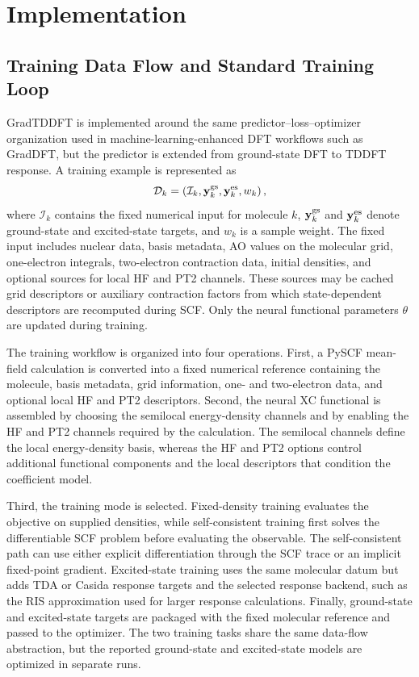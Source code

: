 \section{Implementation}
\label{sec:implementation}

\subsection{Training Data Flow and Standard Training Loop}
\label{sec:implementation-training-flow}

GradTDDFT is implemented around the same predictor--loss--optimizer
organization used in machine-learning-enhanced DFT workflows such as
GradDFT,\cite{GradDFT} but the predictor is extended from ground-state
DFT to TDDFT response.  A training example is represented as
\begin{equation}
  \mathcal{D}_k
  =
  \left(
    \mathcal{I}_k,
    \mathbf{y}^{\rm gs}_k,
    \mathbf{y}^{\rm es}_k,
    w_k
  \right),
  \label{eq:implementation-datum}
\end{equation}
where $\mathcal{I}_k$ contains the fixed numerical input for molecule
$k$, $\mathbf{y}^{\rm gs}_k$ and $\mathbf{y}^{\rm es}_k$ denote
ground-state and excited-state targets, and $w_k$ is a sample weight.
The fixed input includes nuclear data, basis metadata, AO values on
the molecular grid, one-electron integrals, two-electron contraction
data, initial densities, and optional sources for local HF and PT2
channels.  These sources may be cached grid descriptors or auxiliary
contraction factors from which state-dependent descriptors are
recomputed during SCF.  Only the neural functional parameters
$\theta$ are updated during training.

The training workflow is organized into four operations.  First, a
PySCF mean-field calculation is converted into a fixed numerical
reference containing the molecule, basis metadata, grid information,
one- and two-electron data, and optional local HF and PT2 descriptors.
Second, the neural XC functional is assembled by choosing the
semilocal energy-density channels and by enabling the HF and PT2
channels required by the calculation.  The semilocal channels define
the local energy-density basis, whereas the HF and PT2 options control
additional functional components and the local descriptors that
condition the coefficient model.

Third, the training mode is selected.  Fixed-density training evaluates
the objective on supplied densities, while self-consistent training
first solves the differentiable SCF problem before evaluating the
observable.  The self-consistent path can use either explicit
differentiation through the SCF trace or an implicit fixed-point
gradient.  Excited-state training uses the same molecular datum but
adds TDA or Casida response targets and the selected response backend,
such as the RIS approximation used for larger response calculations.
Finally, ground-state and excited-state targets are packaged with the
fixed molecular reference and passed to the optimizer.  The two
training tasks share the same data-flow abstraction, but the reported
ground-state and excited-state models are optimized in separate runs.

